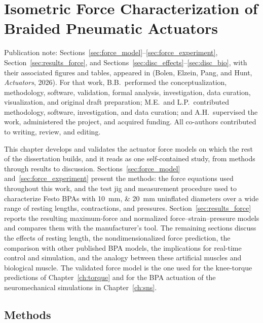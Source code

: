 \chapter{Isometric Force Characterization of Braided Pneumatic Actuators}\label{ch:muscles}\label{ch:methods}\label{ch:discussion}
\graphicspath{{D:/Github/Bipedal_Robot/Documentation/Reports and Papers/Dissertation/Figures/20-muscles/}{figs/20-muscles/}}

{\doublespacing\normalsize\upshape
\noindent Publication note: Sections~\ref{sec:force_model}--\ref{sec:force_experiment}, Section~\ref{sec:results_force}, and Sections~\ref{sec:disc_effects}--\ref{sec:disc_bio}, with their associated figures and tables, appeared in \citet{bolen_2026} (Bolen, Elzein, Pang, and Hunt, \emph{Actuators}, 2026). For that work, B.B.\ performed the conceptualization, methodology, software, validation, formal analysis, investigation, data curation, visualization, and original draft preparation; M.E.\ and L.P.\ contributed methodology, software, investigation, and data curation; and A.H.\ supervised the work, administered the project, and acquired funding. All co-authors contributed to writing, review, and editing.\par}

This chapter develops and validates the actuator force models on which the rest of the dissertation builds, and it reads as one self-contained study, from methods through results to discussion. Sections~\ref{sec:force_model} and~\ref{sec:force_experiment} present the methods: the force equations used throughout this work, and the test jig and measurement procedure used to characterize Festo BPAs with \qtylist{10;20}{\mm} uninflated diameters over a wide range of resting lengths, contractions, and pressures. Section~\ref{sec:results_force} reports the resulting maximum-force and normalized force--strain--pressure models and compares them with the manufacturer's tool. The remaining sections discuss the effects of resting length, the nondimensionalized force prediction, the comparison with other published BPA models, the implications for real-time control and simulation, and the analogy between these artificial muscles and biological muscle. The validated force model is the one used for the knee-torque predictions of Chapter~\ref{ch:torque} and for the BPA actuation of the neuromechanical simulations in Chapter~\ref{ch:sns}.

\section{Methods}

